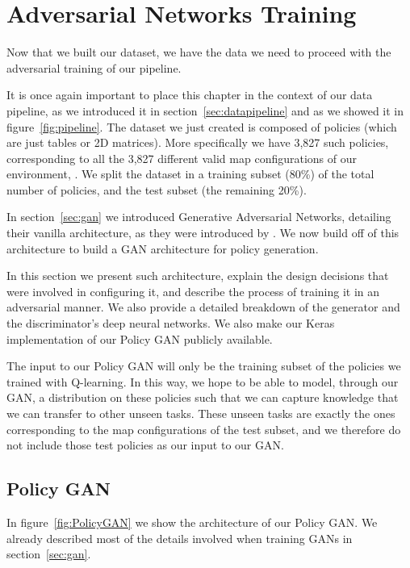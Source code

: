 
\chapter{Adversarial Networks Training} %
\label{Chapter5} %

Now that we built our dataset, we have the data we need to proceed with the adversarial training of our pipeline.

It is once again important to place this chapter in the context of our data pipeline, as we introduced it in section~\ref{sec:datapipeline} and as we showed it in figure~\ref{fig:pipeline}. The dataset we just created is composed of policies (which are just tables or 2D matrices).  More specifically we have 3,827 such policies, corresponding to all the 3,827 different valid map configurations of our environment, . We split the dataset in a training subset (80\%) of the total number of policies, and the test subset (the remaining 20\%).

In section~\ref{sec:gan} we introduced Generative Adversarial Networks, detailing their vanilla architecture, as they were introduced by \citeauthor{goodfellow2014generative}. We now build off of this architecture to build a GAN architecture for policy generation.

In this section we present such architecture, explain the design decisions that were involved in configuring it, and describe the process of training it in an adversarial manner. We also provide a detailed breakdown of the generator and the discriminator's deep neural networks. We also make our Keras implementation of our Policy GAN publicly available.

The input to our Policy GAN will only be the training subset of the policies we trained with Q-learning. In this way, we hope to be able to model, through our GAN, a distribution on these policies such that we can capture knowledge that we can transfer to other unseen tasks.
These unseen tasks are exactly the ones corresponding to the map configurations of the test subset, and we therefore do not include those test policies as our input to our GAN.


\section{Policy GAN}
In figure~\ref{fig:PolicyGAN} we show the architecture of our Policy GAN.
We already described most of the details involved when training GANs in section~\ref{sec:gan}. 

